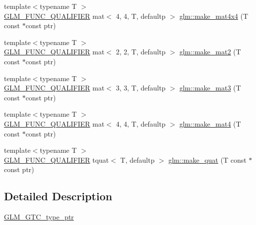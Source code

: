 \begin{DoxyCompactItemize}
\item 
{\footnotesize template$<$typename T $>$ }\\\hyperlink{setup_8hpp_a33fdea6f91c5f834105f7415e2a64407}{G\+L\+M\+\_\+\+F\+U\+N\+C\+\_\+\+Q\+U\+A\+L\+I\+F\+I\+ER} mat$<$ 4, 4, T, defaultp $>$ \hyperlink{group__gtc__type__ptr_ga8f084be30e404844bfbb4a551ac2728c}{glm\+::make\+\_\+mat4x4} (T const $\ast$const ptr)
\item 
{\footnotesize template$<$typename T $>$ }\\\hyperlink{setup_8hpp_a33fdea6f91c5f834105f7415e2a64407}{G\+L\+M\+\_\+\+F\+U\+N\+C\+\_\+\+Q\+U\+A\+L\+I\+F\+I\+ER} mat$<$ 2, 2, T, defaultp $>$ \hyperlink{group__gtc__type__ptr_ga04409e74dc3da251d2501acf5b4b546c}{glm\+::make\+\_\+mat2} (T const $\ast$const ptr)
\item 
{\footnotesize template$<$typename T $>$ }\\\hyperlink{setup_8hpp_a33fdea6f91c5f834105f7415e2a64407}{G\+L\+M\+\_\+\+F\+U\+N\+C\+\_\+\+Q\+U\+A\+L\+I\+F\+I\+ER} mat$<$ 3, 3, T, defaultp $>$ \hyperlink{group__gtc__type__ptr_ga611ee7c4d4cadfc83a8fa8e1d10a170f}{glm\+::make\+\_\+mat3} (T const $\ast$const ptr)
\item 
{\footnotesize template$<$typename T $>$ }\\\hyperlink{setup_8hpp_a33fdea6f91c5f834105f7415e2a64407}{G\+L\+M\+\_\+\+F\+U\+N\+C\+\_\+\+Q\+U\+A\+L\+I\+F\+I\+ER} mat$<$ 4, 4, T, defaultp $>$ \hyperlink{group__gtc__type__ptr_gae7bcedb710d1446c87fd1fc93ed8ee9a}{glm\+::make\+\_\+mat4} (T const $\ast$const ptr)
\item 
{\footnotesize template$<$typename T $>$ }\\\hyperlink{setup_8hpp_a33fdea6f91c5f834105f7415e2a64407}{G\+L\+M\+\_\+\+F\+U\+N\+C\+\_\+\+Q\+U\+A\+L\+I\+F\+I\+ER} tquat$<$ T, defaultp $>$ \hyperlink{group__gtc__type__ptr_gaadafb6600af2633e4c98cc64c72f5269}{glm\+::make\+\_\+quat} (T const $\ast$const ptr)
\end{DoxyCompactItemize}


\subsection{Detailed Description}
\hyperlink{group__gtc__type__ptr}{G\+L\+M\+\_\+\+G\+T\+C\+\_\+type\+\_\+ptr} 
